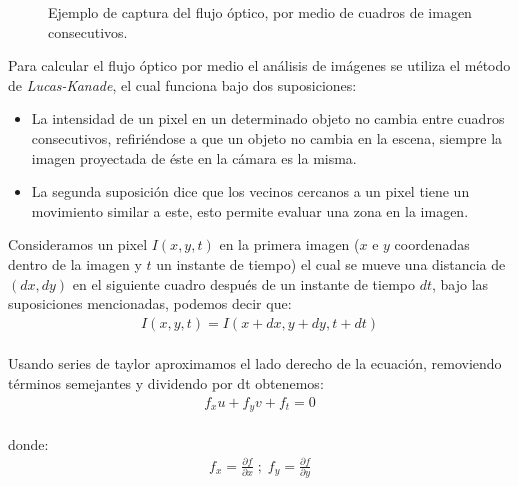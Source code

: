 \documentclass{iccmemoria}
\begin{document}
\begin{figure}[H]
  \centering
  
  \caption[Captura de flujo óptico.]{Ejemplo de captura del flujo óptico, por medio de cuadros de imagen consecutivos.}
  \label{fig:ejemplo_flujo_optico}
\end{figure}

Para calcular el flujo óptico por medio el análisis de imágenes se utiliza el método de \emph{Lucas-Kanade}, el cual funciona bajo dos suposiciones:

\begin{itemize}
\item La intensidad de un pixel en un determinado objeto no cambia entre cuadros consecutivos, refiriéndose a que un objeto no cambia en la escena, siempre la imagen proyectada de éste en la cámara es la misma.

\item La segunda suposición dice que los vecinos cercanos a un pixel tiene un movimiento similar a este, esto permite evaluar una zona en la imagen.
\end{itemize}

Consideramos un pixel $I(x, y,t)$ en la primera imagen ($x$ e $y$ coordenadas dentro de la imagen y $t$ un instante de tiempo) el cual se mueve una distancia de $(dx, dy)$ en el siguiente cuadro después de un instante de tiempo $dt$, bajo las suposiciones mencionadas, podemos decir que:\\

\begin{equation}
	\begin{split}
		I(x,y,t) = I(x+dx, y+dy, t+dt)
	\end{split}
\end{equation}
\\

Usando series de taylor aproximamos el lado derecho de la ecuación, removiendo términos semejantes y dividendo por dt obtenemos:\\

\begin{equation}
	\begin{split}
		f_x u + f_y v + f_t = 0
	\end{split}
\end{equation}\\

donde:\\

\begin{equation}
	\begin{split}
		f_x = \frac{\partial f}{\partial x} \; ; \; f_y = \frac{\partial f}{\partial y}
	\end{split}
\end{equation}\\
\end{document}
